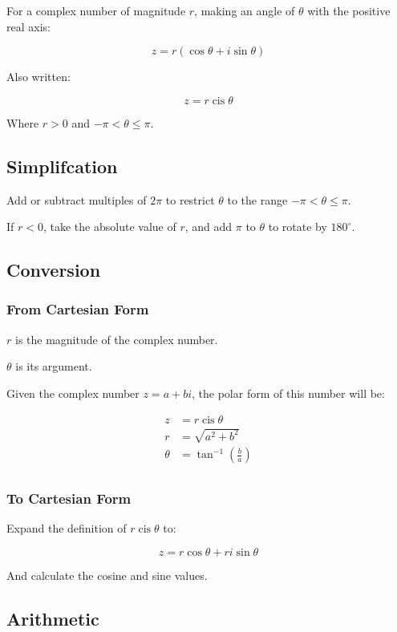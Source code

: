 \documentclass[a4paper,11pt]{report}
\DeclareMathOperator\cis{cis}
\begin{document}
For a complex number of magnitude $r$, making an angle of $\theta$ with the
positive real axis:

$$
z = r (\cos{\theta} + i\sin{\theta})
$$

Also written:

$$
z = r \cis{\theta}
$$

Where $r > 0$ and $-\pi < \theta \leq \pi$.

\subsection{Simplifcation}

Add or subtract multiples of $2\pi$ to restrict $\theta$ to the range
$-\pi < \theta \leq \pi$.

If $r < 0$, take the absolute value of $r$, and add $\pi$ to $\theta$ to rotate
by $180^\circ$.

\subsection{Conversion}

\subsubsection{From Cartesian Form}

$r$ is the magnitude of the complex number.

$\theta$ is its argument.

Given the complex number $z = a + bi$, the polar form of this number will be:

$$
\begin{aligned}
z & = r \cis{\theta} \\
r & = \sqrt{a^2 + b^2} \\
\theta & = \tan^{-1}(\frac{b}{a}) \\
\end{aligned}
$$

\subsubsection{To Cartesian Form}

Expand the definition of $r \cis{\theta}$ to:

$$
z = r \cos{\theta} + ri\sin{\theta}
$$

And calculate the cosine and sine values.

\subsection{Arithmetic}
\end{document}
